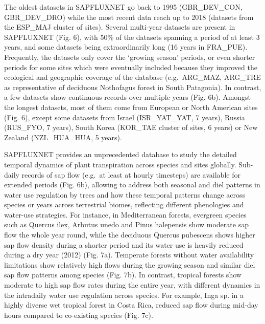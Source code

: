 \documentclass[11pt,twoside]{reedthesis}
\begin{document}
The oldest datasets in SAPFLUXNET go back to 1995 (GBR\_DEV\_CON,
GBR\_DEV\_DRO) while the most recent data reach up to 2018 (datasets
from the ESP\_MAJ cluster of sites). Several multi-year datasets are
present in SAPFLUXNET (Fig. 6), with 50\% of the datasets spanning a
period of at least 3 years, and some datasets being extraordinarily long
(16 years in FRA\_PUE). Frequently, the datasets only cover the `growing
season' periods, or even shorter periods for some sites which were
eventually included because they improved the ecological and geographic
coverage of the database (e.g.~ARG\_MAZ, ARG\_TRE as representative of
deciduous Nothofagus forest in South Patagonia). In contrast, a few
datasets show continuous records over multiple years (Fig. 6b). Amongst
the longest datasets, most of them come from European or North American
sites (Fig. 6), except some datasets from Israel (ISR\_YAT\_YAT, 7
years), Russia (RUS\_FYO, 7 years), South Korea (KOR\_TAE cluster of
sites, 6 years) or New Zealand (NZL\_HUA\_HUA, 5 years).\par 

SAPFLUXNET provides an unprecedented database to study the detailed
temporal dynamics of plant transpiration across species and sites
globally. Sub-daily records of sap flow (e.g.~at least at hourly
timesteps) are available for extended periods (Fig. 6b), allowing to
address both seasonal and diel patterns in water use regulation by trees
and how these temporal patterns change across species or years across
terrestrial biomes, reflecting different phenologies and water-use
strategies. For instance, in Mediterranean forests, evergreen species
such as Quercus ilex, Arbutus unedo and Pinus halepensis show moderate
sap flow the whole year round, while the deciduous Quercus pubescens
shows higher sap flow density during a shorter period and its water use
is heavily reduced during a dry year (2012) (Fig. 7a). Temperate forests
without water availability limitations show relatively high flows during
the growing season and similar diel sap flow patterns among species
(Fig. 7b). In contrast, tropical forests show moderate to high sap flow
rates during the entire year, with different dynamics in the intradaily
water use regulation across species. For example, Inga sp. in a highly
diverse wet tropical forest in Costa Rica, reduced sap flow during
mid-day hours compared to co-existing species (Fig. 7c).\par
\end{document}
